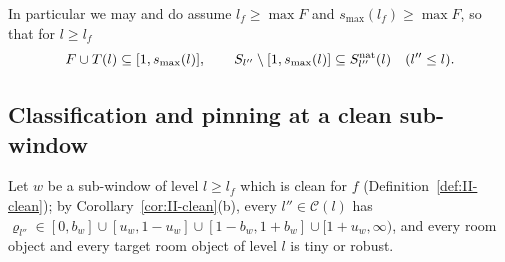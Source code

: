 \documentclass[10pt]{amsart}
\theoremstyle{definition}
\theoremstyle{remark}
\begin{document}
In particular we may and do assume $l_f\ge\max F$ and
$s_{\max}(l_f)\ge\max F$, so that for $l\ge l_f$
\begin{equation}\label{eq:II-Finside}
 F\cup T(l)\subseteq[1,s_{\max}(l)],\qquad
 S_{l''}\setminus[1,s_{\max}(l)]\subseteq S^{\rm nat}_{l''}(l)
 \quad(l''\le l).
\end{equation}

\subsection{Classification and pinning at a clean sub-window}
\label{subsec:II-pin}

Let $w$ be a sub-window of level $l\ge l_f$ which is clean for $f$
(Definition~\ref{def:II-clean}); by Corollary~\ref{cor:II-clean}(b), every
$l''\in\mathcal C(l)$ has $\varrho_{l''}\in[0,b_w]\cup[u_w,1-u_w]\cup[1-b_w,
1+b_w]\cup[1+u_w,\infty)$, and every room object and every target room
object of level $l$ is tiny or robust.
\end{document}
